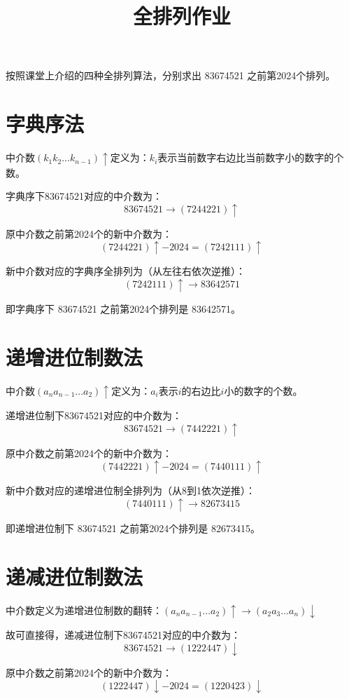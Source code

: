 \documentclass[12pt]{article}
\title{全排列作业}
\begin{document}
\maketitle

按照课堂上介绍的四种全排列算法，分别求出 83674521 之前第2024个排列。

\section*{字典序法}

中介数$(k_{1}k_{2}...k_{n-1})\uparrow$定义为：$k_{i}$表示当前数字右边比当前数字小的数字的个数。

字典序下83674521对应的中介数为：
\[83674521 \rightarrow (7244221)\uparrow\]

原中介数之前第2024个的新中介数为：
\[(7244221)\uparrow-2024 = (7242111)\uparrow\]

新中介数对应的字典序全排列为（从左往右依次逆推）：
\[(7242111)\uparrow \rightarrow 83642571\]

即字典序下 83674521 之前第2024个排列是 83642571。

\section*{递增进位制数法}

中介数$(a_{n}a_{n-1}...a_{2})\uparrow$定义为：$a_{i}$表示$i$的右边比$i$小的数字的个数。

递增进位制下83674521对应的中介数为：
\[83674521 \rightarrow (7442221)\uparrow\]

原中介数之前第2024个的新中介数为：
\[(7442221)\uparrow-2024 = (7440111)\uparrow\]

新中介数对应的递增进位制全排列为（从8到1依次逆推）：
\[(7440111)\uparrow \rightarrow 82673415\]

即递增进位制下 83674521 之前第2024个排列是 82673415。

\section*{递减进位制数法}

中介数定义为递增进位制数的翻转：$(a_{n}a_{n-1}...a_{2})\uparrow \rightarrow (a_{2}a_{3}...a_{n})\downarrow$

故可直接得，递减进位制下83674521对应的中介数为：
\[83674521 \rightarrow (1222447)\downarrow\]

原中介数之前第2024个的新中介数为：
\[(1222447)\downarrow -2024 = (1220423)\downarrow\]
\end{document}
